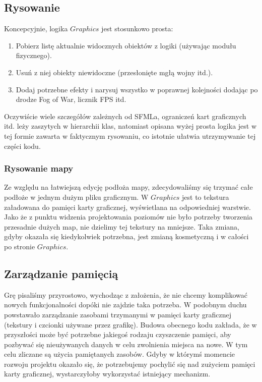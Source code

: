 \documentclass[licencjacka]{pracamgr}
\begin{document}
    \subsection{Rysowanie}
      Koncepcyjnie, logika $Graphics$ jest stosunkowo prosta:
      \begin{enumerate}
       \item Pobierz listę aktualnie widocznych obiektów z logiki (używając modułu fizycznego).
       \item Usuń z niej obiekty niewidoczne (przesłonięte mgłą wojny itd.).
       \item Dodaj potrzebne efekty i narysuj wszystko w poprawnej kolejności dodając po drodze Fog of War, licznik FPS
	  itd.
      \end{enumerate}
      Oczywiście wiele szczegółów zależnych od SFMLa, ograniczeń kart graficznych itd. leży zaszytych w hierarchii klas,
      natomiast opisana wyżej prosta logika jest w tej formie zawarta w faktycznym rysowaniu, co istotnie ułatwia
      utrzymywanie tej części kodu.

    \subsubsection{Rysowanie mapy}
      Ze względu na łatwiejszą edycję podłoża mapy, zdecydowaliśmy się trzymać całe podłoże w jednym dużym pliku
      graficznym. W $Graphics$ jest to tekstura załadowana do pamięci karty graficznej, wyświetlana na odpowiedniej
      warstwie. Jako że z punktu widzenia projektowania poziomów nie było potrzeby tworzenia przesadnie dużych map,
      nie dzielimy tej tekstury na mniejsze. Taka zmiana, gdyby okazała się kiedykolwiek potrzebna, jest zmianą
      kosmetyczną i w całości po stronie $Graphics$.

    \subsection{Zarządzanie pamięcią}
      Grę pisaliśmy przyrostowo, wychodząc z założenia, że nie chcemy komplikować nowych funkcjonalności dopóki nie
      zajdzie taka potrzeba. W podobnym duchu powstawało zarządzanie zasobami trzymanymi w pamięci karty graficznej
      (tekstury i czcionki używane przez grafikę). Budowa obecnego kodu zakłada, że w przyszłości może być potrzebne
      jakiegoś rodzaju czyszczenie pamięci, aby pozbywać się nieużywanych danych w celu zwolnienia miejsca na nowe.
      W tym celu zliczane są użycia pamiętanych zasobów. Gdyby w którymś momencie rozwoju projektu okazało się, że
      potrzebujemy pochylić się nad zużyciem pamięci karty graficznej, wystarczyłoby wykorzystać istniejący mechanizm.
\end{document}
